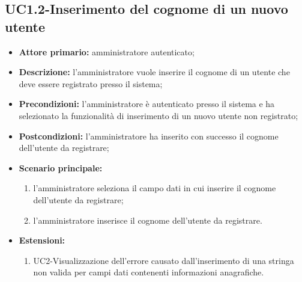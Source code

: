 \subsection{UC1.2-Inserimento del cognome di un nuovo utente}
\begin{itemize}
	\item \textbf{Attore primario:} amministratore autenticato;

	\item \textbf{Descrizione:} l'amministratore vuole inserire il cognome di un utente che deve essere registrato presso il sistema;

	\item \textbf{Precondizioni:} l'amministratore è autenticato presso il sistema e ha selezionato la funzionalità di inserimento di un nuovo utente non registrato;

	\item \textbf{Postcondizioni:} l'amministratore ha inserito con successo il cognome dell'utente da registrare;

	\item \textbf{Scenario principale:}
		\begin{enumerate}
    		\item l'amministratore seleziona il campo dati in cui inserire il cognome dell'utente da registrare;
    			\item l'amministratore inserisce il cognome dell'utente da registrare.
		\end{enumerate}
	\item \textbf{Estensioni:}
		\begin{enumerate}
    		\item UC2-Visualizzazione dell'errore causato dall'inserimento di una stringa non valida per campi dati contenenti informazioni anagrafiche.
		\end{enumerate}
\end{itemize}
